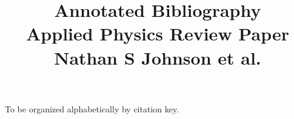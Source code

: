 \documentclass[notitlepage]{revtex4-1}
\begin{document}
\title{Annotated Bibliography \\ Applied Physics Review Paper \\ Nathan S Johnson et al.}
\maketitle


To be organized alphabetically by citation key.

\end{document}
